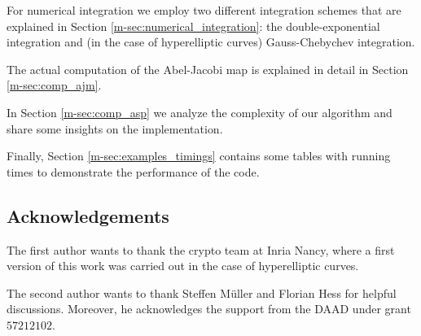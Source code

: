 \documentclass[main.tex]{subfiles}
\begin{document}
  For numerical integration we employ two different integration schemes that
  are explained in Section \ref{m-sec:numerical_integration}: the
  double-exponential integration and
  (in the case of hyperelliptic curves) Gauss-Chebychev integration.

  The actual computation of the Abel-Jacobi map is explained in detail in
  Section \ref{m-sec:comp_ajm}.

  In Section \ref{m-sec:comp_asp} we analyze the complexity of our algorithm
  and share some insights on the implementation.

  Finally, Section \ref{m-sec:examples_timings} contains some tables with
  running times to demonstrate the performance of the code.

  \subsection{Acknowledgements}

  The first author wants to thank the crypto team at Inria Nancy, where
  a first version of this work was carried out in the case of hyperelliptic
  curves.

  The second author wants to thank Steffen Müller and Florian Hess for helpful discussions.
  Moreover, he acknowledges the support from the DAAD under grant $57212102$.
\end{document}
